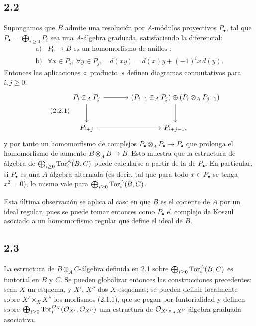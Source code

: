 \subsection*{2.2}
Supongamos que \(B\) admite una resolución por \(A\)-módulos proyectivos \(P_\bullet\), tal que \(P_\bullet=\bigoplus_{i\ge0}P_i\) sea una \(A\)-álgebra graduada, satisfaciendo la diferencial:
\[
\begin{array}{ll}
\text{a)}& P_0\longrightarrow B\text{ es un homomorfismo de anillos~;}\\[0.4ex]
\text{b)}& \forall x\in P_i,\ \forall y\in P_j,\quad d(xy)=d(x)y+(-1)^i x\,d(y).
\end{array}
\]
Entonces las aplicaciones «~producto~» definen diagramas conmutativos para \(i,j\ge0\):
\begin{equation}\tag{2.2.1}
\begin{tikzcd}[column sep=large,row sep=large]
P_i\otimes_A P_j \arrow[r] \arrow[d] & (P_{i-1}\otimes_A P_j)\oplus(P_i\otimes_A P_{j-1}) \arrow[d]\\
P_{i+j} \arrow[r] & P_{i+j-1},
\end{tikzcd}
\end{equation}
y por tanto un homomorfismo de complejos \(P_\bullet\otimes_A P_\bullet\to P_\bullet\) que prolonga el homomorfismo de aumento \(B\otimes_A B\to B\). Esto muestra que la estructura de álgebra de \(\bigoplus_{i\ge0}\operatorname{Tor}_i^A(B,C)\) puede calcularse a partir de la de \(P_\bullet\). En particular, si \(P_\bullet\) es una \(A\)-álgebra alternada (es decir, tal que para todo \(x\in P_\bullet\) se tenga \(x^2=0\)), lo mismo vale para \(\bigoplus_{i\ge0}\operatorname{Tor}_i^A(B,C)\).

Esta última observación se aplica al caso en que \(B\) es el cociente de \(A\) por un ideal regular, pues se puede tomar entonces como \(P_\bullet\) el complejo de Koszul asociado a un homomorfismo regular que define el ideal de \(B\).

\subsection*{2.3}
La estructura de \(B\otimes_A C\)-álgebra definida en 2.1 sobre \(\bigoplus_{i\ge0}\operatorname{Tor}_i^A(B,C)\) es funtorial en \(B\) y \(C\). Se pueden globalizar entonces las construcciones precedentes: sean \(X\) un esquema, y \(X'\), \(X''\) dos \(X\)-esquemas; se pueden definir localmente sobre \(X'\times_X X''\) los morfismos (2.1.1), que se pegan por funtorialidad y definen sobre \(\bigoplus_{i\ge0}\operatorname{Tor}_i^{\mathcal O_X}(\mathcal O_{X'},\mathcal O_{X''})\) una estructura de \(\mathcal O_{X'\times_X X''}\)-álgebra graduada asociativa.


